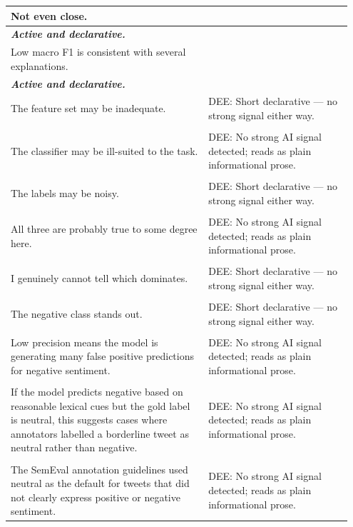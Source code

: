 \documentclass[11pt]{article}
\begin{document}
\begin{longtable}{|p{0.55\linewidth}|p{0.40\linewidth}|}
\hline
Not even close. & \\[2pt]
\hline
\textbf{\textit{Active and declarative.}}\vspace{2em} & \\
\hline
Low macro F1 is consistent with several explanations. & \\[2pt]
\hline
\textbf{\textit{Active and declarative.}}\vspace{2em} & \\
\hline
The feature set may be inadequate. & DEE: Short declarative --- no strong signal either way. \\[2pt]
\hline
\rule{0pt}{3.5cm} & \\
\hline
The classifier may be ill-suited to the task. & DEE: No strong AI signal detected; reads as plain informational prose. \\[2pt]
\hline
\rule{0pt}{3.5cm} & \\
\hline
The labels may be noisy. & DEE: Short declarative --- no strong signal either way. \\[2pt]
\hline
\rule{0pt}{3.5cm} & \\
\hline
All three are probably true to some degree here. & DEE: No strong AI signal detected; reads as plain informational prose. \\[2pt]
\hline
\rule{0pt}{3.5cm} & \\
\hline
I genuinely cannot tell which dominates. & DEE: Short declarative --- no strong signal either way. \\[2pt]
\hline
\rule{0pt}{3.5cm} & \\
\hline
The negative class stands out. & DEE: Short declarative --- no strong signal either way. \\[2pt]
\hline
\rule{0pt}{3.5cm} & \\
\hline
Low precision means the model is generating many false positive predictions for negative sentiment. & DEE: No strong AI signal detected; reads as plain informational prose. \\[2pt]
\hline
\rule{0pt}{3.5cm} & \\
\hline
If the model predicts negative based on reasonable lexical cues but the gold label is neutral, this suggests cases where annotators labelled a borderline tweet as neutral rather than negative. & DEE: No strong AI signal detected; reads as plain informational prose. \\[2pt]
\hline
\rule{0pt}{3.5cm} & \\
\hline
The SemEval annotation guidelines used neutral as the default for tweets that did not clearly express positive or negative sentiment. & DEE: No strong AI signal detected; reads as plain informational prose. \\[2pt]

\end{longtable}
\end{document}

